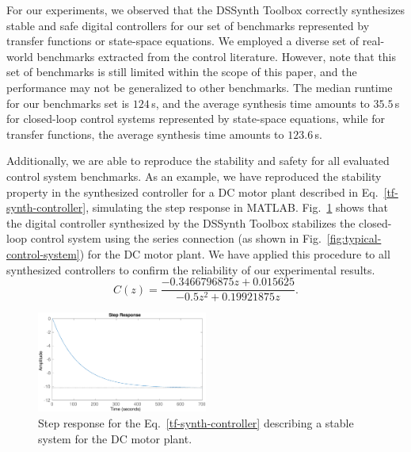 \documentclass[10pt,conference]{IEEEtran}
\newcommand\tool{{DSSynth Toolbox}\xspace}
\begin{document}

For our experiments, we observed that the \tool correctly synthesizes stable
and safe digital controllers for our set of benchmarks represented by
transfer functions or state-space equations.  We employed a diverse set of
real-world benchmarks extracted from the control literature.  However, note
that this set of benchmarks is still limited within the scope of this paper,
and the performance may not be generalized to other benchmarks.  The median
runtime for our benchmarks set is $124$\,s, and the average synthesis time
amounts to $35.5$\,s for closed-loop control systems represented by
state-space equations, while for transfer functions, the average synthesis
time amounts to $123.6$\,s.

Additionally, we are able to reproduce the stability and safety for all
evaluated control system benchmarks.  As an example, we have reproduced the
stability property in the synthesized controller for a DC motor plant
described in Eq.~\eqref{tf-synth-controller}, simulating the step response
in MATLAB.  Fig.~\ref{tf-step-response} shows that the digital controller
synthesized by the \tool stabilizes the closed-loop control system using the
series connection (as shown in Fig.~\ref{fig:typical-control-system}) for
the DC motor plant.  We have applied this procedure to all synthesized
controllers to confirm the reliability of our experimental results.
%
\begin{equation}
\label{tf-synth-controller}
C(z)=\frac{-0.3466796875z+0.015625}{-0.5z^{2}+0.19921875z}.
\end{equation}

\begin{figure}[ht]
  \includegraphics[width=0.5\textwidth]{tf-step-response.eps}
  \caption{Step response for the Eq.~\eqref{tf-synth-controller} describing a stable system for the DC motor plant.}
  \label{tf-step-response}
\end{figure}
\end{document}
